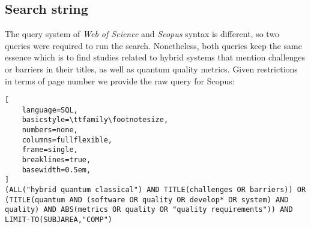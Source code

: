 
\subsection{Search string}

The query system of \textit{Web of Science} and \textit{Scopus} syntax is different, so two queries were required to run the search. Nonetheless, both queries keep the same essence which is to find studies related to hybrid systems that mention challenges or barriers in their titles, as well as quantum quality metrics. %
Given restrictions in terms of page number we provide the raw query for Scopus:

{\small
\begin{lstlisting}[
    language=SQL,
    basicstyle=\ttfamily\footnotesize,
    numbers=none,
    columns=fullflexible,
    frame=single,
    breaklines=true,
    basewidth=0.5em,
]
(ALL("hybrid quantum classical") AND TITLE(challenges OR barriers)) OR (TITLE(quantum AND (software OR quality OR develop* OR system) AND quality) AND ABS(metrics OR quality OR "quality requirements")) AND LIMIT-TO(SUBJAREA,"COMP")
\end{lstlisting}
}



